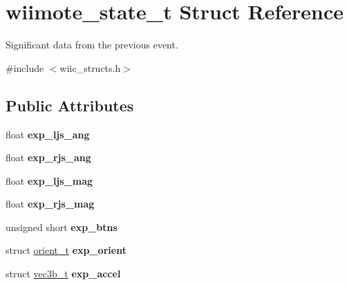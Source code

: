 \hypertarget{structwiimote__state__t}{\section{wiimote\-\_\-state\-\_\-t Struct Reference}
\label{structwiimote__state__t}
}


Significant data from the previous event.  




{\ttfamily \#include $<$wiic\-\_\-structs.\-h$>$}

\subsection*{Public Attributes}
\begin{DoxyCompactItemize}
\item 
\hypertarget{structwiimote__state__t_ab7b3b7f67410c6f05c50dcf8f2b15183}{float {\bfseries exp\-\_\-ljs\-\_\-ang}}\label{structwiimote__state__t_ab7b3b7f67410c6f05c50dcf8f2b15183}

\item 
\hypertarget{structwiimote__state__t_a2d1b33ecd8d40b092252b4d92fcb3b5c}{float {\bfseries exp\-\_\-rjs\-\_\-ang}}\label{structwiimote__state__t_a2d1b33ecd8d40b092252b4d92fcb3b5c}

\item 
\hypertarget{structwiimote__state__t_a7d839190a251d46851da469eb7b021fe}{float {\bfseries exp\-\_\-ljs\-\_\-mag}}\label{structwiimote__state__t_a7d839190a251d46851da469eb7b021fe}

\item 
\hypertarget{structwiimote__state__t_a244c7dc0a1d8398bee1a9ef9507a6dc0}{float {\bfseries exp\-\_\-rjs\-\_\-mag}}\label{structwiimote__state__t_a244c7dc0a1d8398bee1a9ef9507a6dc0}

\item 
\hypertarget{structwiimote__state__t_a7ddd1c96d28f9a6115fc0f800fbd388a}{unsigned short {\bfseries exp\-\_\-btns}}\label{structwiimote__state__t_a7ddd1c96d28f9a6115fc0f800fbd388a}

\item 
\hypertarget{structwiimote__state__t_ac225be6bf5d06fd370ad47386647e6e6}{struct \hyperlink{structorient__t}{orient\-\_\-t} {\bfseries exp\-\_\-orient}}\label{structwiimote__state__t_ac225be6bf5d06fd370ad47386647e6e6}

\item 
\hypertarget{structwiimote__state__t_a27a90665a24f25dd98021a5c1ff2d264}{struct \hyperlink{structvec3b__t}{vec3b\-\_\-t} {\bfseries exp\-\_\-accel}}\label{structwiimote__state__t_a27a90665a24f25dd98021a5c1ff2d264}


\end{DoxyCompactItemize}
